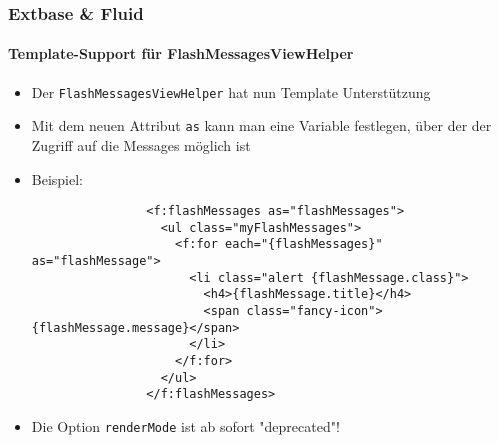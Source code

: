 
\begin{frame}[fragile]
	\frametitle{Extbase \& Fluid}
	\framesubtitle{Template-Support für FlashMessagesViewHelper}

	\lstset{basicstyle=\tiny\ttfamily}

	\begin{itemize}

		\item Der \texttt{FlashMessagesViewHelper} hat nun Template Unterstützung

		\item Mit dem neuen Attribut \texttt{as} kann man eine Variable festlegen,
			über der der Zugriff auf die Messages möglich ist

		\item Beispiel:

			\begin{lstlisting}
				<f:flashMessages as="flashMessages">
				  <ul class="myFlashMessages">
				    <f:for each="{flashMessages}" as="flashMessage">
				      <li class="alert {flashMessage.class}">
				        <h4>{flashMessage.title}</h4>
				        <span class="fancy-icon">{flashMessage.message}</span>
				      </li>
				    </f:for>
				  </ul>
				</f:flashMessages>
			\end{lstlisting}

		\item Die Option \texttt{renderMode} ist ab sofort "deprecated"!

	\end{itemize}

\end{frame}


